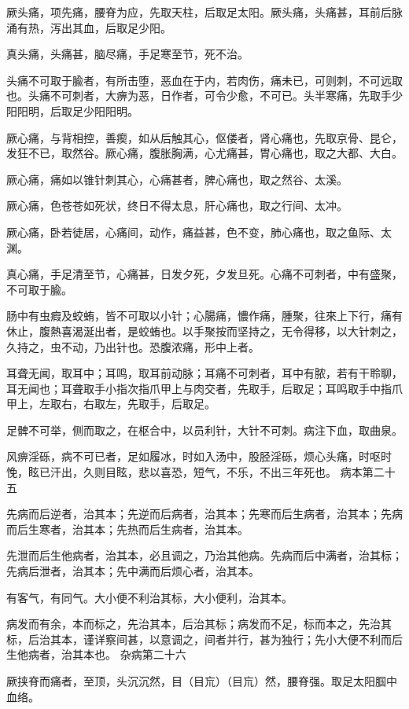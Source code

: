 \documentclass[a4paper,12pt,UTF8,twoside]{ctexbook}
\begin{document}
	厥头痛，项先痛，腰脊为应，先取天柱，后取足太阳。厥头痛，头痛甚，耳前后脉涌有热，泻出其血，后取足少阳。
	
	真头痛，头痛甚，脑尽痛，手足寒至节，死不治。
	
	头痛不可取于腧者，有所击堕，恶血在于内，若肉伤，痛未已，可则刺，不可远取也。头痛不可刺者，大痹为恶，日作者，可令少愈，不可已。头半寒痛，先取手少阳阳明，后取足少阳阳明。
	
	厥心痛，与背相控，善瘈，如从后触其心，伛偻者，肾心痛也，先取京骨、昆仑，发狂不已，取然谷。厥心痛，腹胀胸满，心尤痛甚，胃心痛也，取之大都、大白。
	
	厥心痛，痛如以锥针刺其心，心痛甚者，脾心痛也，取之然谷、太溪。
	
	厥心痛，色苍苍如死状，终日不得太息，肝心痛也，取之行间、太冲。
	
	厥心痛，卧若徒居，心痛间，动作，痛益甚，色不变，肺心痛也，取之鱼际、太渊。
	
	真心痛，手足清至节，心痛甚，日发夕死，夕发旦死。心痛不可刺者，中有盛聚，不可取于腧。
	
	肠中有虫瘕及蛟蛕，皆不可取以小针；心腸痛，憹作痛，腫聚，往來上下行，痛有休止，腹熱喜渴涎出者，是蛟蛕也。以手聚按而坚持之，无令得移，以大针刺之，久持之，虫不动，乃出针也。恐腹浓痛，形中上者。
	
	耳聋无闻，取耳中；耳鸣，取耳前动脉；耳痛不可刺者，耳中有脓，若有干聆聊，耳无闻也；耳聋取手小指次指爪甲上与肉交者，先取手，后取足；耳鸣取手中指爪甲上，左取右，右取左，先取手，后取足。
	
	足髀不可举，侧而取之，在枢合中，以员利针，大针不可刺。病注下血，取曲泉。
	
	风痹淫砾，病不可已者，足如履冰，时如入汤中，股胫淫砾，烦心头痛，时呕时悗，眩已汗出，久则目眩，悲以喜恐，短气，不乐，不出三年死也。
	病本第二十五
	
	先病而后逆者，治其本；先逆而后病者，治其本；先寒而后生病者，治其本；先病而后生寒者，治其本；先热而后生病者，治其本。
	
	先泄而后生他病者，治其本，必且调之，乃治其他病。先病而后中满者，治其标；先病后泄者，治其本；先中满而后烦心者，治其本。
	
	有客气，有同气。大小便不利治其标，大小便利，治其本。
	
	病发而有余，本而标之，先治其本，后治其标；病发而不足，标而本之，先治其标，后治其本，谨详察间甚，以意调之，间者并行，甚为独行；先小大便不利而后生他病者，治其本也。
	杂病第二十六
	
	厥挟脊而痛者，至顶，头沉沉然，目（目巟）（目巟）然，腰脊强。取足太阳腘中血络。
	
\end{document}
